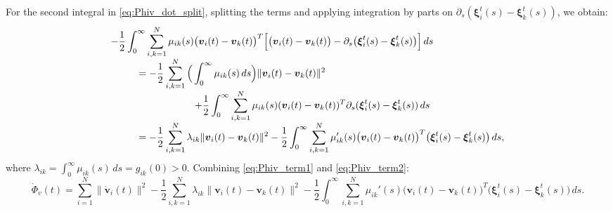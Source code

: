 \documentclass[11pt]{amsart}
\numberwithin{equation}{section}
\begin{document}
For the second integral in \eqref{eq:Phiv_dot_split}, splitting the terms and applying integration by parts on $\partial_s(\boldsymbol{\xi}_i^t(s)-\boldsymbol{\xi}_k^t(s))$, we obtain:
{\footnotesize
\begin{equation}\label{eq:Phiv_term2}
\begin{array}{l}
\displaystyle{-\frac12\int_0^\infty\sum_{i,k=1}^N\mu_{ik}(s)\bigl(\boldsymbol{v}_i(t)-\boldsymbol{v}_k(t)\bigr)^T\Bigl[\bigl(\boldsymbol{v}_i(t)-\boldsymbol{v}_k(t)\bigr)-\partial_s\bigl(\boldsymbol{\xi}_i^t(s)-\boldsymbol{\xi}_k^t(s)\bigr)\Bigr]\,ds\hspace{1cm}}\\
\displaystyle{\hspace{1cm}=-\frac12\sum_{i,k=1}^N \Big(\int_0^\infty \mu_{ik}(s)\,ds\Big) \|\boldsymbol{v}_i(t)-\boldsymbol{v}_k(t)\|^2} \\
\displaystyle{\hspace{3cm}+ \frac12\int_0^\infty \sum_{i,k=1}^N \mu_{ik}(s)(\boldsymbol{v}_i(t)-\boldsymbol{v}_k(t))^T \partial_s (\boldsymbol{\xi}_i^t(s)-\boldsymbol{\xi}_k^t(s))\,ds  }\\
\displaystyle{\hspace{1cm}= -\frac12\sum_{i,k=1}^N \lambda_{ik}\|\boldsymbol{v}_i(t)-\boldsymbol{v}_k(t)\|^2 - \frac12\int_0^\infty\sum_{i,k=1}^N\mu_{ik}'(s)\bigl(\boldsymbol{v}_i(t)-\boldsymbol{v}_k(t)\bigr)^T\bigl(\boldsymbol{\xi}_i^t(s)-\boldsymbol{\xi}_k^t(s)\bigr)\,ds,}
\end{array}
\end{equation}
}
where $\lambda_{ik} = \int_0^\infty \mu_{ik}(s)\,ds = g_{ik}(0) > 0$. Combining \eqref{eq:Phiv_term1} and \eqref{eq:Phiv_term2}:
{\small
\begin{equation*}\label{eq:Phiv_dot_final}
\dot{\Phi}_v(t) = \sum_{i=1}^N\|\dot{\boldsymbol{v}}_i(t)\|^2 -\frac12\sum_{i,k=1}^N\lambda_{ik}\|\boldsymbol{v}_i(t)-\boldsymbol{v}_k(t)\|^2 -\frac12\int_0^\infty\sum_{i,k=1}^N\mu_{ik}'(s)\bigl(\boldsymbol{v}_i(t)-\boldsymbol{v}_k(t)\bigr)^T\bigl(\boldsymbol{\xi}_i^t(s)-\boldsymbol{\xi}_k^t(s)\bigr)\,ds.
\end{equation*}
}
\end{document}
